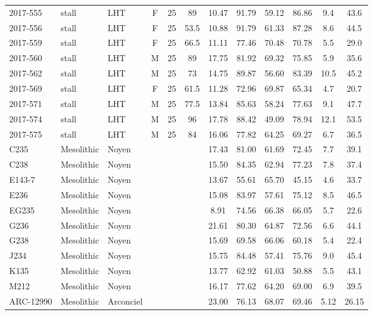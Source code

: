 \documentclass[12pt,a4paper]{article}
\begin{document}
\begin{landscape}
\begin{table}[!htbp]
\begin{tabular}{@{}lllccccccccc@{}}
    2017-555 & stall & LHT & F & 25 & 89 & 10.47 & 91.79 & 59.12 & 86.86 & 9.4 & 43.6 \\
    2017-556 & stall & LHT & F & 25 & 53.5 & 10.88 & 91.79 & 61.33 & 87.28 & 8.6 & 44.5 \\
    2017-559 & stall & LHT & F & 25 & 66.5 & 11.11 & 77.46 & 70.48 & 70.78 & 5.5 & 29.0 \\
    2017-560 & stall & LHT & M & 25 & 89 & 17.75 & 81.92 & 69.32 & 75.85 & 5.9 & 35.6 \\
    2017-562 & stall & LHT & M & 25 & 73 & 14.75 & 89.87 & 56.60 & 83.39 & 10.5 & 45.2 \\
    2017-569 & stall & LHT & F & 25 & 61.5 & 11.28 & 72.96 & 69.87 & 65.34 & 4.7 & 20.7 \\
    2017-571 & stall & LHT & M & 25 & 77.5 & 13.84 & 85.63 & 58.24 & 77.63 & 9.1 & 47.7 \\
    2017-574 & stall & LHT & M & 25 & 96 & 17.78 & 88.42 & 49.09 & 78.94 & 12.1 & 53.5 \\
    2017-575 & stall & LHT & M & 25 & 84 & 16.06 & 77.82 & 64.25 & 69.27 & 6.7 & 36.5 \\
    C235 & Mesolithic & Noyen & ~ & ~ & ~ & 17.43 & 81.00 & 61.69 & 72.45 & 7.7 & 39.1 \\
    C238 & Mesolithic & Noyen & ~ & ~ & ~ & 15.50 & 84.35 & 62.94 & 77.23 & 7.8 & 37.4 \\
    E143-7 & Mesolithic & Noyen & ~ & ~ & ~ & 13.67 & 55.61 & 65.70 & 45.15 & 4.6 & 33.7 \\
    E236 & Mesolithic & Noyen & ~ & ~ & ~ & 15.08 & 83.97 & 57.61 & 75.12 & 8.5 & 46.5 \\
    EG235 & Mesolithic & Noyen & ~ & ~ & ~ & 8.91 & 74.56 & 66.38 & 66.05 & 5.7 & 22.6 \\
    G236 & Mesolithic & Noyen & ~ & ~ & ~ & 21.61 & 80.30 & 64.87 & 72.56 & 6.6 & 44.1 \\
    G238 & Mesolithic & Noyen & ~ & ~ & ~ & 15.69 & 69.58 & 66.06 & 60.18 & 5.4 & 22.4 \\
    J234 & Mesolithic & Noyen & ~ & ~ & ~ & 15.75 & 84.48 & 57.41 & 75.76 & 9.0 & 45.4 \\
    K135 & Mesolithic & Noyen & ~ & ~ & ~ & 13.77 & 62.92 & 61.03 & 50.88 & 5.5 & 43.1 \\
    M212 & Mesolithic & Noyen & ~ & ~ & ~ & 16.17 & 77.62 & 64.20 & 69.00 & 6.9 & 39.5 \\
    ARC-12990 & Mesolithic & Arconciel & ~ & ~ & ~ & 23.00 & 76.13 & 68.07 & 69.46 & 5.12 & 26.15 \\

\end{tabular}
\end{table}
\end{landscape}
\end{document}
